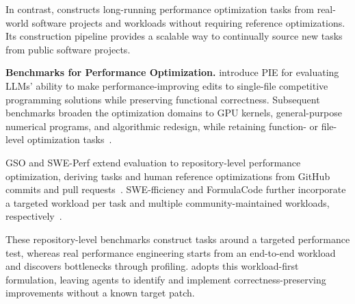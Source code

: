 In contrast, \perfrace{} constructs long-running performance optimization tasks from real-world software projects and workloads without requiring reference optimizations. Its construction pipeline provides a scalable way to continually source new tasks from public software projects.

\textbf{Benchmarks for Performance Optimization.} \citet{shypula2024learning} introduce PIE for evaluating LLMs' ability to make performance-improving edits to single-file competitive programming solutions while preserving functional correctness. Subsequent benchmarks broaden the optimization domains to GPU kernels, general-purpose numerical programs, and algorithmic redesign, while retaining function- or file-level optimization tasks~\citep{du2024mercury,huang2024effibench,liu2024evalperf,waghjale2024ecco,ouyang2025kernelbench,press2025algotune}.

GSO and SWE-Perf extend evaluation to repository-level performance optimization, deriving tasks and human reference optimizations from GitHub commits and pull requests~\citep{shetty2025gso,he2025sweperf}. SWE-fficiency and FormulaCode further incorporate a targeted workload per task and multiple community-maintained workloads, respectively~\citep{ma2025swefficiency,sehgal2026formulacode}.

These repository-level benchmarks construct tasks around a targeted performance test, whereas real performance engineering starts from an end-to-end workload and discovers bottlenecks through profiling. \perfrace{} adopts this workload-first formulation, leaving agents to identify and implement correctness-preserving improvements without a known target patch.
